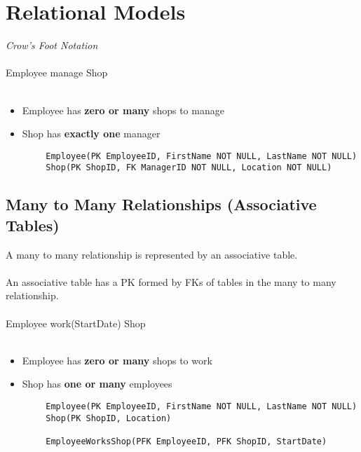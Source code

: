 \documentclass[11pt, a4paper]{article}
\begin{document}
    \section{Relational Models}
    \emph{Crow's Foot Notation} \\\\ 

    Employee manage Shop \\\\ 
    \begin{itemize}
        \item Employee has \textbf{zero or many} shops to manage 
        \item Shop has \textbf{exactly one} manager 
    \end{itemize}
    \begin{verbatim}
        Employee(PK EmployeeID, FirstName NOT NULL, LastName NOT NULL)
        Shop(PK ShopID, FK ManagerID NOT NULL, Location NOT NULL)
    \end{verbatim}

    \subsection{Many to Many Relationships (Associative Tables)}
    A many to many relationship is represented by an associative table. \\\\ 
    An associative table has a PK formed by FKs of tables in the many to many 
    relationship. \\\\ 
    Employee work(StartDate) Shop \\\\ 
    \begin{itemize}
        \item Employee has \textbf{zero or many} shops to work 
        \item Shop has \textbf{one or many} employees 
    \end{itemize}
    \begin{verbatim}
        Employee(PK EmployeeID, FirstName NOT NULL, LastName NOT NULL)
        Shop(PK ShopID, Location)

        EmployeeWorksShop(PFK EmployeeID, PFK ShopID, StartDate)
    \end{verbatim}
\end{document}
